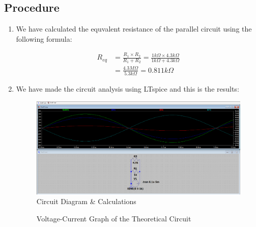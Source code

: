 \subsection{Procedure}
\begin{enumerate}
    \item We have calculated the equvalent resistance of the parallel circuit using the following formula:
    
    \begin{align*}
        R_{eq} &= \frac{R_1\times R_2}{R_1 + R_2} = \frac{1k\Omega \times 4.3k\Omega}{1k\Omega + 4.3k\Omega} \\
        &= \frac{4.3M\Omega}{5.3k\Omega} = 0.811k\Omega
    \end{align*}
    
    \item We have made the circuit analysis using LTspice and this is the results:
    \begin{figure}[h]
        \centering
        \includegraphics[width=1\textwidth]{assets/taks_4.png}
        \caption{Circuit Diagram \& Calculations}
    \end{figure}

    \begin{figure}[h]
        \centering
        \caption{Voltage-Current Graph of the Theoretical Circuit}
    \end{figure}


\end{enumerate}
